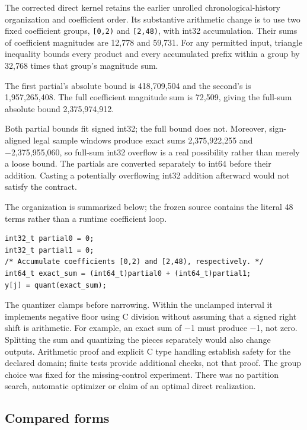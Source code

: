 \documentclass[conference]{IEEEtran}
\begin{document}
The corrected direct kernel retains the earlier unrolled
chronological-history organization and coefficient order. Its
substantive arithmetic change is to use two fixed coefficient groups,
\texttt{{[}0,2)} and \texttt{{[}2,48)}, with int32 accumulation. Their
sums of coefficient magnitudes are 12,778 and 59,731. For any permitted
input, triangle inequality bounds every product and every accumulated
prefix within a group by 32,768 times that group's magnitude sum.

The first partial's absolute bound is 418,709,504 and the second's is
1,957,265,408. The full coefficient magnitude sum is 72,509, giving the
full-sum absolute bound 2,375,974,912.

Both partial bounds fit signed int32; the full bound does not. Moreover,
sign-aligned legal sample windows produce exact sums 2,375,922,255 and
−2,375,955,060, so full-sum int32 overflow is a real possibility rather
than merely a loose bound. The partials are converted separately to
int64 before their addition. Casting a potentially overflowing int32
addition afterward would not satisfy the contract.

The organization is summarized below; the frozen source contains the
literal 48 terms rather than a runtime coefficient loop.

\begin{Verbatim}[breaklines,breakanywhere,breaksymbolleft={},breaksymbolright={},fontsize=\scriptsize]
int32_t partial0 = 0;
int32_t partial1 = 0;
/* Accumulate coefficients [0,2) and [2,48), respectively. */
int64_t exact_sum = (int64_t)partial0 + (int64_t)partial1;
y[j] = quant(exact_sum);
\end{Verbatim}

The quantizer clamps before narrowing. Within the unclamped interval it
implements negative floor using C division without assuming that a
signed right shift is arithmetic. For example, an exact sum of −1 must
produce −1, not zero. Splitting the sum and quantizing the pieces
separately would also change outputs. Arithmetic proof and explicit C
type handling establish safety for the declared domain; finite tests
provide additional checks, not that proof. The group choice was fixed
for the missing-control experiment. There was no partition search,
automatic optimizer or claim of an optimal direct realization.

\subsection{Compared forms}\label{compared-forms}
\end{document}
